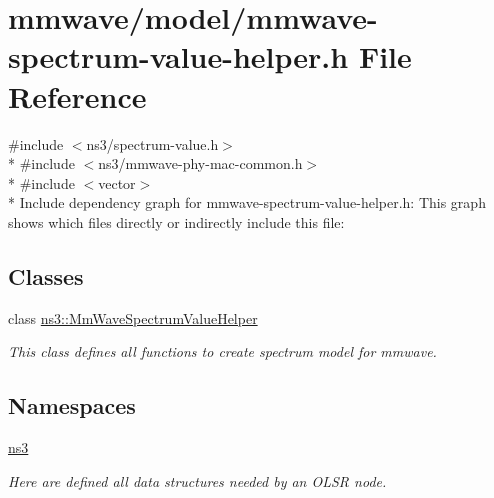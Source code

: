 \hypertarget{mmwave-spectrum-value-helper_8h}{}\section{mmwave/model/mmwave-\/spectrum-\/value-\/helper.h File Reference}
\label{mmwave-spectrum-value-helper_8h}
{\ttfamily \#include $<$ns3/spectrum-\/value.\+h$>$}\\*
{\ttfamily \#include $<$ns3/mmwave-\/phy-\/mac-\/common.\+h$>$}\\*
{\ttfamily \#include $<$vector$>$}\\*
Include dependency graph for mmwave-\/spectrum-\/value-\/helper.h\+:
This graph shows which files directly or indirectly include this file\+:
\subsection*{Classes}
\begin{DoxyCompactItemize}
\item 
class \hyperlink{classns3_1_1MmWaveSpectrumValueHelper}{ns3\+::\+Mm\+Wave\+Spectrum\+Value\+Helper}
\begin{DoxyCompactList}\small\item\em This class defines all functions to create spectrum model for mmwave. \end{DoxyCompactList}\end{DoxyCompactItemize}
\subsection*{Namespaces}
\begin{DoxyCompactItemize}
\item 
 \hyperlink{namespacens3}{ns3}
\begin{DoxyCompactList}\small\item\em Here are defined all data structures needed by an O\+L\+SR node. \end{DoxyCompactList}\end{DoxyCompactItemize}
